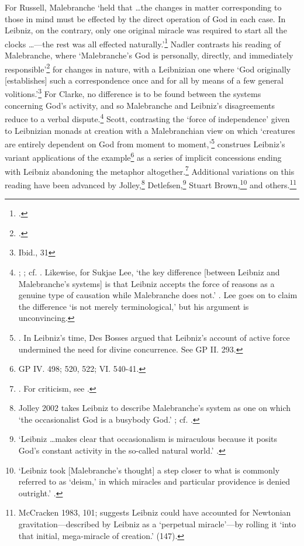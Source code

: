 \documentclass{article}
\begin{document}
For Russell, Malebranche `held that \ldots the changes in matter
corresponding to those in mind must be effected by the direct operation
of God in each case. In Leibniz, on the contrary, only one original
miracle was required to start all the clocks \ldots---the rest
was all effected naturally.'\footnote{\autocite[137]{Russell1951}.} Nadler
contrasts his reading of Malebranche, where `Malebranche's God is
personally, directly, and immediately responsible'\footnote{\autocite[32]{Nadler1993}.} for changes in nature, with a Leibnizian one where `God
originally {[}establishes{]} such a correspondence once and for all by
means of a few general volitions.'\footnote{Ibid., 31} For Clarke, no
difference is to be found between the systems concerning God's activity,
and so Malebranche and Leibniz's disagreements reduce to a verbal
dispute.\footnote{\autocite[121]{Clarke1989}; \autocite[passim]{Clarke1995}; cf. \autocite[39]{Black1997}. Likewise, for Sukjae Lee, `the key difference {[}between Leibniz
  and Malebranche's systems{]} is that Leibniz accepts the force of
  reasons as a genuine type of causation while Malebranche does not.'
  \autocite[230]{Lee2004}. Lee goes on to claim the difference `is not merely
  terminological,' but his argument is unconvincing.} Scott, contrasting
the `force of independence' given to Leibnizian monads at creation with
a Malebranchian view on which `creatures are entirely dependent on God
from moment to moment,'\footnote{\autocite[452]{Scott1997}. In Leibniz's time, Des
  Bosses argued that Leibniz's account of active force undermined the
  need for divine concurrence. See GP II. 293.} construes Leibniz's
variant applications of the example\footnote{GP IV. 498; 520, 522; VI.
  540-41.} as a series of implicit concessions ending with Leibniz
abandoning the metaphor altogether.\footnote{\autocite[462]{Scott1997}. For
  criticism, see \autocite[321-322]{Bobro2008}.} Additional variations on this
reading have been advanced by Jolley,\footnote{Jolley 2002 takes Leibniz
  to describe Malebranche's system as one on which `the occasionalist
  God is a busybody God.' \autocite[246]{Jolley2002}; cf. \autocite[106-107]{Jolley1990}.}
Detlefsen,\footnote{`Leibniz \ldots makes clear that
  occasionalism is miraculous because it posits God's constant activity
  in the so-called natural world.' \autocite[443]{Detlefsen2003}.} Stuart
Brown,\footnote{`Leibniz took {[}Malebranche's thought{]} a step closer
  to what is commonly referred to as `deism,' in which miracles and
  particular providence is denied outright.' \autocite[273]{Brown2000}.} and
others.\footnote{McCracken 1983, 101; \autocite{Brown2007} suggests Leibniz could
  have accounted for Newtonian gravitation---described by Leibniz as a
  `perpetual miracle'---by rolling it `into that initial, mega-miracle
  of creation.' (147).}
\end{document}
